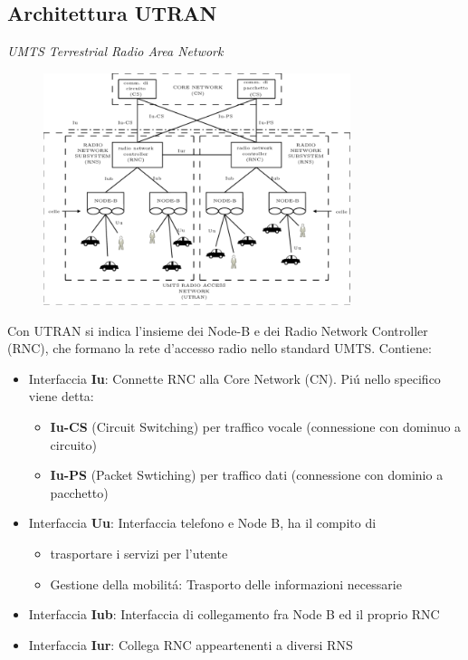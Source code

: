 \documentclass{article}
\begin{document}
\begin{samepage}
\subsection{Architettura UTRAN}
\textit{UMTS Terrestrial Radio Area Network}

\begin{figure}[h]
\includegraphics[width=0.8\textwidth]{img/sdt/architettura_utran}
\centering
\end{figure}


Con UTRAN si indica l'insieme dei Node-B e dei Radio Network Controller (RNC), che formano la rete d'accesso radio nello standard UMTS. Contiene:

\begin{itemize}
    \item Interfaccia \textbf{Iu}: Connette RNC alla Core Network (CN). Pi\'u nello specifico viene detta:
        \begin{itemize}
            \item \textbf{Iu-CS} (Circuit Switching) per traffico vocale (connessione con dominuo a circuito)
            \item \textbf{Iu-PS} (Packet Swtiching)  per traffico dati (connessione con dominio a pacchetto)
        \end{itemize}

    \item Interfaccia \textbf{Uu}: Interfaccia telefono e Node B, ha il compito di
        \begin{itemize}
            \item trasportare i servizi per l'utente
            \item Gestione della mobilit\'a: Trasporto delle informazioni necessarie
        \end{itemize}

    \item Interfaccia \textbf{Iub}: Interfaccia di collegamento fra Node B ed il proprio RNC
    \item Interfaccia \textbf{Iur}: Collega RNC appeartenenti a diversi RNS
\end{itemize}


\end{samepage}
\end{document}
